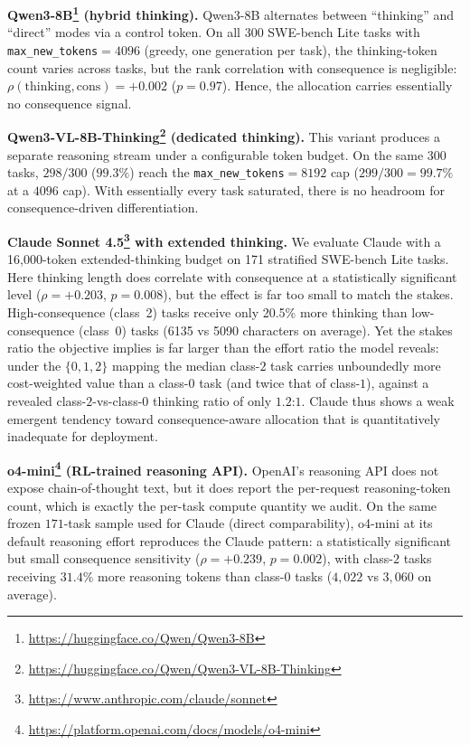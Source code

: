 \documentclass{article}
\begin{document}
\textbf{Qwen3-8B\footnote{\url{https://huggingface.co/Qwen/Qwen3-8B}}  (hybrid thinking).} Qwen3-8B alternates
between ``thinking'' and ``direct'' modes via a control token. On all
$300$ SWE-bench Lite tasks with \texttt{max\_new\_tokens}$=4096$
(greedy, one generation per task), the thinking-token count varies
across tasks, but the rank correlation with consequence is negligible:
$\rho(\mathrm{thinking}, \mathrm{cons}) = +0.002$ ($p = 0.97$). Hence, the allocation carries essentially no consequence signal.

\textbf{Qwen3-VL-8B-Thinking\footnote{\url{https://huggingface.co/Qwen/Qwen3-VL-8B-Thinking}} (dedicated thinking).} This variant
produces a separate reasoning stream under a configurable token
budget. On the same $300$ tasks, $298/300$ ($99.3\%$) reach the
\texttt{max\_new\_tokens}$=8192$ cap ($299/300 = 99.7\%$ at a
$4096$ cap). With essentially every task saturated, there is
no headroom for consequence-driven differentiation.

\textbf{Claude Sonnet 4.5\footnote{\url{https://www.anthropic.com/claude/sonnet}} with extended thinking.} We evaluate Claude 
with a 16,000-token extended-thinking budget on 171 stratified SWE-bench Lite tasks.
Here thinking length does correlate with consequence at a statistically
significant level ($\rho = +0.203$, $p = 0.008$), but the effect is far
too small to match the stakes.  High-consequence (class~2) tasks receive only 20.5\% more thinking than low-consequence (class~0) tasks (6135 vs 5090 characters on average).
Yet the stakes ratio the objective implies is far larger than the
effort ratio the model reveals: under the $\{0,1,2\}$ mapping the
median class-$2$ task carries unboundedly more cost-weighted value than
a class-$0$ task (and twice that of class-$1$), against a revealed
class-$2$-vs-class-$0$ thinking ratio of only $1.2$:$1$.  Claude thus shows a weak emergent tendency
toward consequence-aware allocation that is quantitatively inadequate for
deployment.

\textbf{o4-mini\footnote{\url{https://platform.openai.com/docs/models/o4-mini}} (RL-trained reasoning API).} OpenAI's reasoning
API does not expose chain-of-thought text, but it does report the
per-request reasoning-token count, which is exactly the per-task
compute quantity we audit. On the same frozen $171$-task sample used
for Claude (direct comparability), o4-mini at its default reasoning
effort reproduces the Claude pattern: a statistically significant but
small consequence sensitivity ($\rho = +0.239$, $p = 0.002$), with
class-$2$ tasks receiving $31.4\%$ more reasoning tokens than
class-$0$ tasks ($4{,}022$ vs $3{,}060$ on average).
\end{document}
